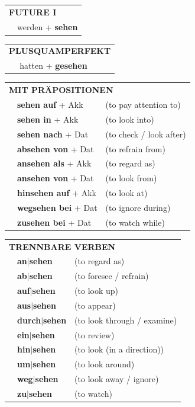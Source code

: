 \documentclass[10pt,a4paper]{revtex4-2}
\begin{document}
\begin{verbbox-acc}
\begin{tabular}{rl}
    \multicolumn{2}{l}{\textbf{FUTURE I} }\\
  &  werden + \textbf{sehen}\\
 
  \end{tabular}
\hfill
   \begin{tabular}{rl}
      \multicolumn{2}{l}{\textbf{PLUSQUAMPERFEKT}}\\
  &  hatten + \textbf{gesehen}\\
  \end{tabular}
  


 \vspace{10pt}

   \begin{tabular}{lll}
      \multicolumn{3}{l}{\textbf{MIT PRÄPOSITIONEN}}\\
& \textbf{sehen auf} + Akk & (to pay attention to)\\
& \textbf{sehen in} + Akk & (to look into)\\
& \textbf{sehen nach} + Dat & (to check / look after)\\
& \textbf{absehen von} + Dat & (to refrain from)\\
& \textbf{ansehen als} + Akk & (to regard as)\\
& \textbf{ansehen von} + Dat & (to look from)\\
& \textbf{hinsehen auf} + Akk & (to look at)\\
& \textbf{wegsehen bei} + Dat & (to ignore during)\\
& \textbf{zusehen bei} + Dat & (to watch while)\\
  \end{tabular}
  \hfill
   \begin{tabular}{lll}
      \multicolumn{3}{l}{\textbf{TRENNBARE VERBEN}}\\
 & \textbf{an$|$sehen} & (to regard as)\\
  & \textbf{ab$|$sehen} & (to foresee / refrain)\\
   & \textbf{auf$|$sehen} & (to look up)\\
     & \textbf{aus$|$sehen} & (to appear)\\
    & \textbf{durch$|$sehen} & (to look through / examine)\\
      & \textbf{ein$|$sehen} & (to review)\\
    & \textbf{hin$|$sehen} & (to look (in a direction))\\
      & \textbf{um$|$sehen} & (to look around)\\
     & \textbf{weg$|$sehen} & (to look away / ignore)\\
      & \textbf{zu$|$sehen} & (to watch)\\
  \end{tabular}


  \vspace{-5pt}

\end{verbbox-acc}
\end{document}

